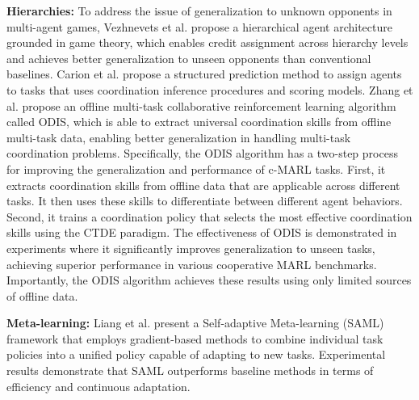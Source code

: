 \documentclass[acmsmall]{acmart}
\begin{document}
\textbf{Hierarchies: } To address the issue of generalization to unknown opponents in multi-agent games, Vezhnevets et al. \cite{pmlr-v119-vezhnevets20a} propose a hierarchical agent architecture grounded in game theory, which enables credit assignment across hierarchy levels and achieves better generalization to unseen opponents than conventional baselines.
Carion et al. \cite{NEURIPS2019_3c3c139b} propose a structured prediction method to assign agents to tasks that uses coordination inference procedures and scoring models. 
Zhang et al. \cite{zhang2023discovering} propose an offline multi-task collaborative reinforcement learning algorithm called ODIS, which is able to extract universal coordination skills from offline multi-task data, enabling better generalization in handling multi-task coordination problems. 
Specifically, the ODIS algorithm has a two-step process for improving the generalization and performance of c-MARL tasks.
First, it extracts coordination skills from offline data that are applicable across different tasks. It then uses these skills to differentiate between different agent behaviors.
Second, it trains a coordination policy that selects the most effective coordination skills using the CTDE paradigm. The effectiveness of ODIS is demonstrated in experiments where it significantly improves generalization to unseen tasks, achieving superior performance in various cooperative MARL benchmarks. Importantly, the ODIS algorithm achieves these results using only limited sources of offline data.

\textbf{Meta-learning: }
Liang et al. \cite{Liang2022-yf} present a Self-adaptive Meta-learning (SAML) framework that employs gradient-based methods to combine individual task policies into a unified policy capable of adapting to new tasks.
Experimental results demonstrate that SAML outperforms baseline methods in terms of efficiency and continuous adaptation. 
\end{document}
